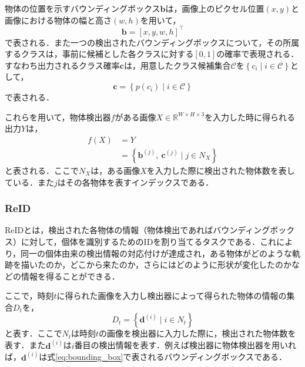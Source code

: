         物体の位置を示すバウンディングボックス$\bm{b}$は，画像上のピクセル位置$(x, y)$と画像における物体の幅と高さ$(w,h)$を用いて，
        \begin{equation}
            \label{eq:bounding_box}
            \bm{b} = \left[x, y, w, h\right]^{\top}
        \end{equation}
        で表される．また一つの検出されたバウンディングボックスについて，その所属するクラスは，事前に候補とした各クラスに対する$[0, 1]$の確率で表現される．すなわち出力されるクラス確率$\bm{c}$は，用意したクラス候補集合$\mathcal{C}$を$\left\{c_i \mid i \in \mathcal{C}\right\}$として，
        \begin{equation}
            \label{eq:class_probability}
            \bm{c} = \left\{p(c_i) \mid i \in \mathcal{C}\right\}
        \end{equation}
        で表される．

        これらを用いて，物体検出器$f$がある画像$X \in \mathbb{R}^{W \times H \times 3}$を入力した時に得られる出力$Y$は，
        \begin{equation}
            \label{eq:object_detection}
            \begin{aligned}
                f(X) &= Y
                \\ &= \left\{\bm{b}^{(j)}, ~\bm{c}^{(j)} \mid j \in N_X\right\}
            \end{aligned}
        \end{equation}
        と表される．ここで$N_X$は，ある画像$X$を入力した際に検出された物体数を表している．また$j$はその各物体を表すインデックスである．

        \subsubsection{ReID}
        ReIDとは，検出された各物体の情報（物体検出であればバウンディングボックス）に対して，個体を識別するためのIDを割り当てるタスクである．これにより，同一の個体由来の検出情報の対応付けが達成され，ある物体がどのような軌跡を描いたのか，どこから来たのか，さらにはどのように形状が変化したのかなどの情報を得ることができる．

        ここで，時刻$t$に得られた画像を入力し検出器によって得られた物体の情報の集合$D_t$を，
        \begin{equation}
            \label{eq:input_to_reid}
            D_t = \left\{\bm{d}^{(i)} \mid i \in N_t\right\}
        \end{equation}
        と表す．ここで$N_t$は時刻$t$の画像を検出器に入力した際に，検出された物体数を表す．また$\bm{d}^{(i)}$は$i$番目の検出情報を表す．例えば検出器に物体検出器を用いれば，$\bm{d}^{(i)}$は式\ref{eq:bounding_box}で表されるバウンディングボックスである．

